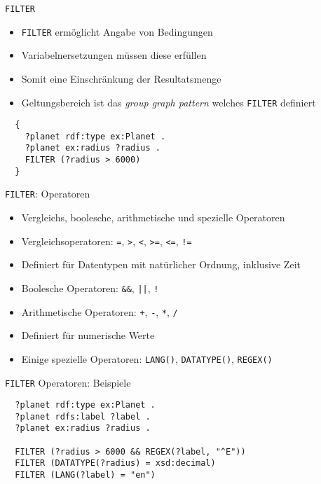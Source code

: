 \documentclass{beamer}
\begin{document}
\begin{frame}[fragile]{\texttt{FILTER}}

	\begin{itemize}
		\item \texttt{FILTER} ermöglicht Angabe von Bedingungen
		\item Variabelnersetzungen müssen diese erfüllen
		\item Somit eine Einschränkung der Resultatsmenge
		\item Geltungsbereich ist das \emph{group graph pattern} welches \texttt{FILTER} definiert
	\end{itemize}
	
	\begin{lstlisting}
  {
    ?planet rdf:type ex:Planet .
    ?planet ex:radius ?radius .
    FILTER (?radius > 6000)
  }
	\end{lstlisting}

\end{frame}

\begin{frame}{\texttt{FILTER}: Operatoren}
	
	\begin{itemize}
		\item Vergleichs, boolesche, arithmetische und spezielle Operatoren
		\item Vergleichsoperatoren: \texttt{=}, \texttt{>}, \texttt{<}, \texttt{>=}, \texttt{<=}, \texttt{!=}
		\item Definiert für Datentypen mit natürlicher Ordnung, inklusive Zeit
		\item Boolesche Operatoren: \texttt{\&\&}, \texttt{||}, \texttt{!}
		\item Arithmetische Operatoren: \texttt{+}, \texttt{-}, \texttt{*}, \texttt{/}
		\item Definiert für numerische Werte
		\item Einige spezielle Operatoren: \texttt{LANG()}, \texttt{DATATYPE()}, \texttt{REGEX()} 
	\end{itemize}
	
\end{frame}

\begin{frame}[fragile]{\texttt{FILTER} Operatoren: Beispiele}
	
	\begin{lstlisting}
  ?planet rdf:type ex:Planet .
  ?planet rdfs:label ?label .
  ?planet ex:radius ?radius .
  
  FILTER (?radius > 6000 && REGEX(?label, "^E"))
  FILTER (DATATYPE(?radius) = xsd:decimal)
  FILTER (LANG(?label) = "en")
	\end{lstlisting}
	
\end{frame}
\end{document}

